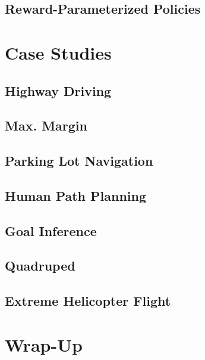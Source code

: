 		\subsection{Reward-Parameterized Policies} %

	\section{Case Studies} %

		\subsection{Highway Driving} %

		\subsection{Max. Margin} %

		\subsection{Parking Lot Navigation} %

		\subsection{Human Path Planning} %

		\subsection{Goal Inference} %

		\subsection{Quadruped} %

		\subsection{Extreme Helicopter Flight} %

	\section{Wrap-Up} %

